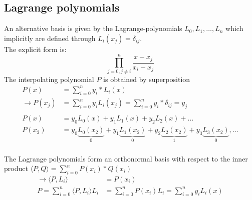 \subsection{Lagrange polynomials}\label{subsec:lagrange-polynomials}
An alternative basis is given by the Lagrange-polynomials $L_0, L_1, \ldots, L_n$ which implicitly are defined through $L_i(x_j) = \delta_{ij}$.\\
The explicit form is:
\begin{equation*}
    \prod_{j=0, j\neq i}^n \frac{x-x_j}{x_i-x_j}
\end{equation*}
The interpolating polynomial $P$ is obtained by superposition
\begin{align*}
    P(x) &= \sum_{i=0}^{n}y_i*L_i(x)\\
    \to P(x_j)&=\sum_{i=0}^{n} y_i L_i(x_j)= \sum_{i=0}^{n} y_i * \delta_{ij} = y_j\\
    \\
    P(x) &= y_0 L_0 (x) + y_1 L_1 (x) + y_2 L_2 (x) + \ldots\\
    P(x_2) &= y_0 \underbrace{L_0
        (x_2)}_0 + y_1 \underbrace{L_1 (x_2)}_0 + y_2  \underbrace{L_2 (x_2)}_{1} + y_3  \underbrace{L_3 (x_2)}_0, \ldots\\
\end{align*}
\begin{remark}
    The Lagrange polynomials form an orthonormal basis with respect
    to the inner product $\langle P, Q \rangle =\sum_{i=0}^{n} P(x_i) * Q(x_i)$
    \begin{align*}
        \to{} \langle P, L_i \rangle &= P(x_i)\\
        P = \sum_{i=0}^n \langle P, L_{i} \rangle L_i &= \sum_{i=0}^{n} P(x_i) L_i
        = \sum_{i=0}^{n} y_i L_i(x)
    \end{align*}
\end{remark}


